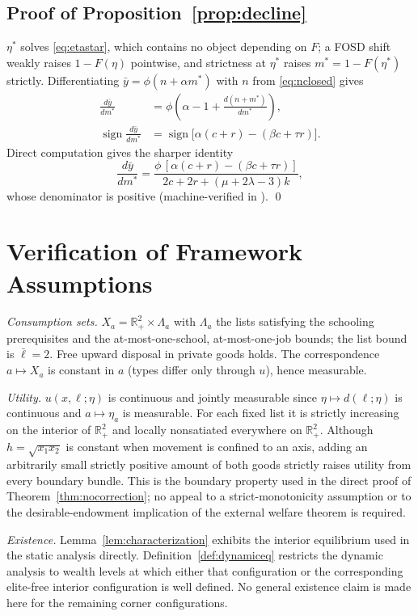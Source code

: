 \documentclass[12pt,letterpaper]{article}
\theoremstyle{definition}
\newcommand{\Lists}{\Lambda}
\newcommand{\R}{\mathbb{R}}
\begin{document}
\subsection{Proof of Proposition~\ref{prop:decline}} $\eta^\ast$ solves \eqref{eq:etastar}, which contains no object depending on $F$; a FOSD shift weakly raises $1-F(\eta)$ pointwise, and strictness at $\eta^\ast$ raises $m^\ast=1-F(\eta^\ast)$ strictly.
Differentiating $\bar{y}=\phi(n+\alpha m^\ast)$ with $n$ from \eqref{eq:nclosed} gives
\[
\begin{aligned}
\frac{d\bar{y}}{dm^\ast}
&=\phi\left(\alpha-1+\frac{d(n+m^\ast)}{dm^\ast}\right),\\
\operatorname{sign}\frac{d\bar{y}}{dm^\ast}
&=\operatorname{sign}\big[\alpha(c+r)-(\beta c+\tau r)\big].
\end{aligned}
\]
Direct computation gives the sharper identity
\[
\frac{d\bar{y}}{dm^\ast}
=
\frac{\phi\,[\alpha(c+r)-(\beta c+\tau r)]}
{2c+2r+(\mu+2\lambda-3)k},
\]
whose denominator is positive (machine-verified in
).
\qed

\section{Verification of Framework Assumptions}\label{app:assumptions}

\emph{Consumption sets.}
$X_a = \R^2_+\times\Lists_a$ with $\Lists_a$ the lists satisfying the schooling prerequisites and the at-most-one-school, at-most-one-job bounds; the list bound is $\bar\ell=2$.
Free upward disposal in private goods holds.
The correspondence $a\mapsto X_a$ is constant in $a$ (types differ only through $u$), hence measurable.

\emph{Utility.}
$u(x,\ell;\eta)$ is continuous and jointly measurable since $\eta\mapsto d(\ell;\eta)$ is continuous and $a\mapsto\eta_a$ is measurable.
For each fixed list it is strictly increasing on the interior of $\R^2_+$ and locally nonsatiated everywhere on $\R^2_+$.
Although $h=\sqrt{x_1x_2}$ is constant when movement is confined to an axis, adding an arbitrarily small strictly positive amount of both goods strictly raises utility from every boundary bundle.
This is the boundary property used in the direct proof of Theorem~\ref{thm:nocorrection}; no appeal to a strict-monotonicity assumption or to the desirable-endowment implication of the external welfare theorem is required.

\emph{Existence.}
Lemma~\ref{lem:characterization} exhibits the interior equilibrium used in the static analysis directly.
Definition~\ref{def:dynamiceq} restricts the dynamic analysis to wealth levels at which either that configuration or the corresponding elite-free interior configuration is well defined.
No general existence claim is made here for the remaining corner configurations.
\end{document}
